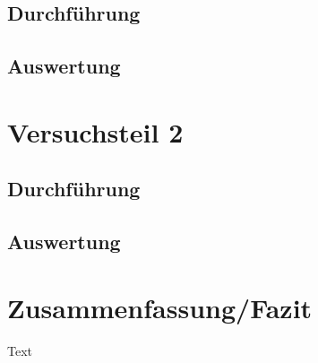 \documentclass[11pt]{scrartcl}
\begin{document}
\subsection{Durchführung}


\subsection{Auswertung}


\section{Versuchsteil 2}



\subsection{Durchführung}



\subsection{Auswertung}




\section{Zusammenfassung/Fazit}

Text
\end{document}
